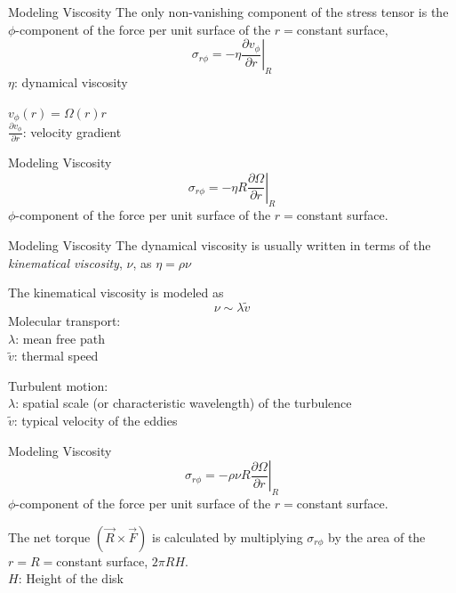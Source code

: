 \documentclass{beamer}
\begin{document}
\begin{frame}{Modeling Viscosity}
	The only non-vanishing component of the stress tensor is the $\phi$-component of the force per unit surface of the $r=$constant surface,  
	\[\sigma_{r\phi} = -\eta \left. \frac{\partial v_\phi}{\partial r} \right|_R \]
	\pause
	$\eta$: dynamical viscosity\\
	\bigskip
	
	$v_\phi (r) = \Omega (r) r$\\
	$\frac{\partial v_\phi}{\partial r}$: velocity gradient
\end{frame}

\begin{frame}{Modeling Viscosity}
	\[\sigma_{r\phi} = -\eta R \left. \frac{\partial \Omega}{\partial r} \right|_R \]
	$\phi$-component of the force per unit surface of the $r=$constant surface.
\end{frame}

\begin{frame}{Modeling Viscosity}
	The dynamical viscosity is usually written in terms of the \textit{kinematical viscosity}, $\nu$, as $\eta = \rho \nu$\\
	\bigskip
	\pause	
	 
	The kinematical viscosity is modeled as
	\[ \nu \sim \lambda \tilde{v}\]
	\pause
	Molecular transport:\\
	$\lambda$: mean free path\\
	$\tilde{v}$: thermal speed\\
	\bigskip
	\pause
	
	Turbulent motion:\\
	$\lambda$: spatial scale (or characteristic wavelength) of the turbulence\\
	$\tilde{v}$: typical velocity of the eddies\\
\end{frame}

\begin{frame}{Modeling Viscosity}
	\[\sigma_{r\phi} = -\rho \nu R \left. \frac{\partial \Omega}{\partial r} \right|_R \]
	$\phi$-component of the force per unit surface of the $r=$constant surface.\\
	\bigskip
	\pause
	
	The net torque $(\vec{R}\times \vec{F} )$ is calculated by multiplying $\sigma_{r\phi} $ by the area of the $r=R=$constant surface, $ 2\pi R H $.\\
	\pause
	$H$: Height of the disk
\end{frame}
\end{document}
